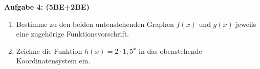 \documentclass[a4paper,12pt]{article}
\newcommand{\Aufgabe}[1]{
  {
  \vspace*{0.5cm}
  \textsf{\textbf{Aufgabe #1}}
  \vspace*{0.2cm}
  
  }
}
\begin{document}
\Aufgabe{4: (5BE+2BE)}

\begin{enumerate}[label={\alph*)}, topsep=5pt,itemsep=4ex,partopsep=1ex,parsep=1ex]
  \item Bestimme zu den beiden untenstehenden Graphen $f(x)$ und $g(x)$ jeweils eine zugehörige Funktionsvorschrift.\\

  \item Zeichne die Funktion $h(x) = 2 \cdot {1,5}^x$ in das obenstehende Koordinatensystem ein.

\end{enumerate}
\end{document}
